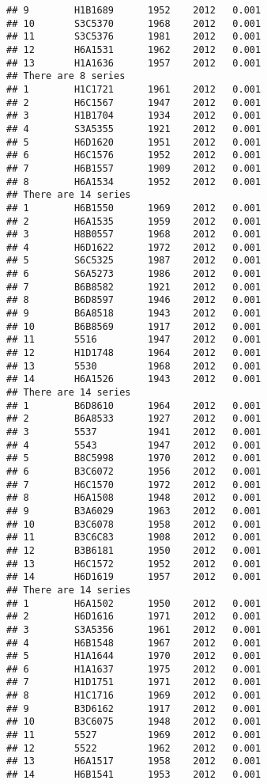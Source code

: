 \documentclass[]{article}
\begin{document}
\begin{verbatim}
## 9        H1B1689      1952    2012   0.001
## 10       S3C5370      1968    2012   0.001
## 11       S3C5376      1981    2012   0.001
## 12       H6A1531      1962    2012   0.001
## 13       H1A1636      1957    2012   0.001
## There are 8 series
## 1        H1C1721      1961    2012   0.001
## 2        H6C1567      1947    2012   0.001
## 3        H1B1704      1934    2012   0.001
## 4        S3A5355      1921    2012   0.001
## 5        H6D1620      1951    2012   0.001
## 6        H6C1576      1952    2012   0.001
## 7        H6B1557      1909    2012   0.001
## 8        H6A1534      1952    2012   0.001
## There are 14 series
## 1        H6B1550      1969    2012   0.001
## 2        H6A1535      1959    2012   0.001
## 3        H8B0557      1968    2012   0.001
## 4        H6D1622      1972    2012   0.001
## 5        S6C5325      1987    2012   0.001
## 6        S6A5273      1986    2012   0.001
## 7        B6B8582      1921    2012   0.001
## 8        B6D8597      1946    2012   0.001
## 9        B6A8518      1943    2012   0.001
## 10       B6B8569      1917    2012   0.001
## 11       5516         1947    2012   0.001
## 12       H1D1748      1964    2012   0.001
## 13       5530         1968    2012   0.001
## 14       H6A1526      1943    2012   0.001
## There are 14 series
## 1        B6D8610      1964    2012   0.001
## 2        B6A8533      1927    2012   0.001
## 3        5537         1941    2012   0.001
## 4        5543         1947    2012   0.001
## 5        B8C5998      1970    2012   0.001
## 6        B3C6072      1956    2012   0.001
## 7        H6C1570      1972    2012   0.001
## 8        H6A1508      1948    2012   0.001
## 9        B3A6029      1963    2012   0.001
## 10       B3C6078      1958    2012   0.001
## 11       B3C6C83      1908    2012   0.001
## 12       B3B6181      1950    2012   0.001
## 13       H6C1572      1952    2012   0.001
## 14       H6D1619      1957    2012   0.001
## There are 14 series
## 1        H6A1502      1950    2012   0.001
## 2        H6D1616      1971    2012   0.001
## 3        S3A5356      1961    2012   0.001
## 4        H6B1548      1967    2012   0.001
## 5        H1A1644      1970    2012   0.001
## 6        H1A1637      1975    2012   0.001
## 7        H1D1751      1971    2012   0.001
## 8        H1C1716      1969    2012   0.001
## 9        B3D6162      1917    2012   0.001
## 10       B3C6075      1948    2012   0.001
## 11       5527         1969    2012   0.001
## 12       5522         1962    2012   0.001
## 13       H6A1517      1958    2012   0.001
## 14       H6B1541      1953    2012   0.001

\end{verbatim}
\end{document}
